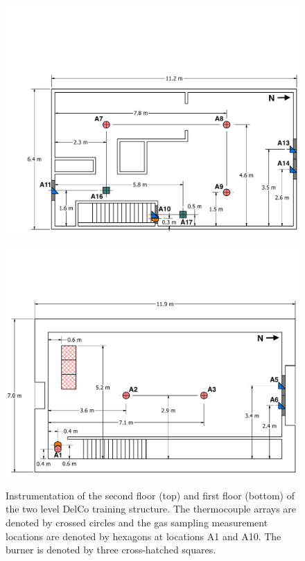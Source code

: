 \begin{figure}[p]
\includegraphics[width=0.94\columnwidth]{FIGURES/DelCo_Trainers/West_Structure_2nd_Floor_Dimensioned_Instrumentation}
\\~\\
\includegraphics[width=\columnwidth]{FIGURES/DelCo_Trainers/West_Structure_1st_Floor_Dimensioned_Instrumentation}
\caption[Instrumentation of the two level DelCo training structure]{Instrumentation of the second floor (top) and first floor (bottom) of the two level DelCo training structure. The thermocouple arrays are denoted by crossed circles and the gas sampling measurement locations are denoted by hexagons at locations A1 and A10. The burner is denoted by three cross-hatched squares.}
\label{fig:west_instrumentation}
\end{figure}


